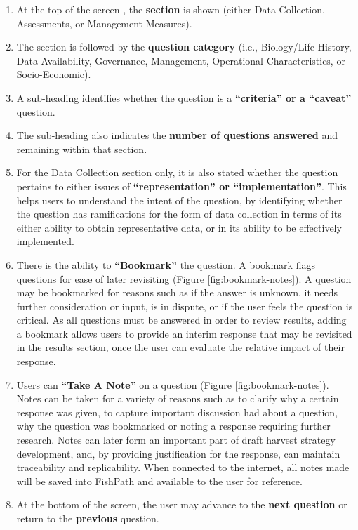 \documentclass[11pt,]{book}
\providecommand{\tightlist}{%
  \setlength{\itemsep}{0pt}\setlength{\parskip}{0pt}}
\begin{document}
\begin{enumerate}
\def\labelenumi{\arabic{enumi}.}
\tightlist
\item
  At the top of the screen , the \textbf{section} is shown (either Data Collection, Assessments, or Management Measures).
\item
  The section is followed by the \textbf{question category} (i.e., Biology/Life History, Data Availability, Governance, Management, Operational Characteristics, or Socio-Economic).
\item
  A sub-heading identifies whether the question is a \textbf{``criteria'' or a ``caveat''} question.
\item
  The sub-heading also indicates the \textbf{number of questions answered} and remaining within that section.
\item
  For the Data Collection section only, it is also stated whether the question pertains to either issues of \textbf{``representation'' or ``implementation''}. This helps users to understand the intent of the question, by identifying whether the question has ramifications for the form of data collection in terms of its either ability to obtain representative data, or in its ability to be effectively implemented.
\item
  There is the ability to \textbf{``Bookmark''} the question. A bookmark flags questions for ease of later revisiting (Figure \ref{fig:bookmark-notes}). A question may be bookmarked for reasons such as if the answer is unknown, it needs further consideration or input, is in dispute, or if the user feels the question is critical. As all questions must be answered in order to review results, adding a bookmark allows users to provide an interim response that may be revisited in the results section, once the user can evaluate the relative impact of their response.
\item
  Users can \textbf{``Take A Note''} on a question (Figure \ref{fig:bookmark-notes}). Notes can be taken for a variety of reasons such as to clarify why a certain response was given, to capture important discussion had about a question, why the question was bookmarked or noting a response requiring further research. Notes can later form an important part of draft harvest strategy development, and, by providing justification for the response, can maintain traceability and replicability. When connected to the internet, all notes made will be saved into FishPath and available to the user for reference.
\item
  At the bottom of the screen, the user may advance to the \textbf{next question} or return to the \textbf{previous} question.
\end{enumerate}
\end{document}
